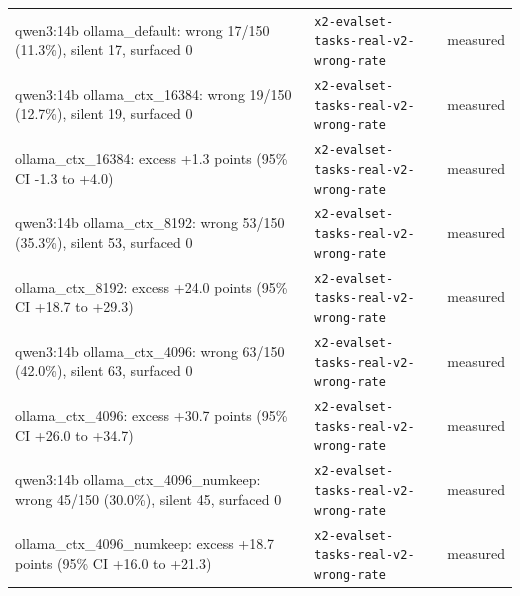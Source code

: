\begin{longtable}{>{\raggedright\arraybackslash}p{}>{\raggedright\arraybackslash}p{}>{\raggedright\arraybackslash}p{}}
\small qwen3:14b ollama\_default: wrong 17/150 (11.3\%), silent 17, surfaced 0 & {\footnotesize \texttt{x2-\allowbreak{}evalset-\allowbreak{}tasks-\allowbreak{}real-\allowbreak{}v2-\allowbreak{}wrong-\allowbreak{}rate}} & \small measured \\

\small qwen3:14b ollama\_ctx\_16384: wrong 19/150 (12.7\%), silent 19, surfaced 0 & {\footnotesize \texttt{x2-\allowbreak{}evalset-\allowbreak{}tasks-\allowbreak{}real-\allowbreak{}v2-\allowbreak{}wrong-\allowbreak{}rate}} & \small measured \\

\small ollama\_ctx\_16384: excess +1.3 points (95\% CI -1.3 to +4.0) & {\footnotesize \texttt{x2-\allowbreak{}evalset-\allowbreak{}tasks-\allowbreak{}real-\allowbreak{}v2-\allowbreak{}wrong-\allowbreak{}rate}} & \small measured \\

\small qwen3:14b ollama\_ctx\_8192: wrong 53/150 (35.3\%), silent 53, surfaced 0 & {\footnotesize \texttt{x2-\allowbreak{}evalset-\allowbreak{}tasks-\allowbreak{}real-\allowbreak{}v2-\allowbreak{}wrong-\allowbreak{}rate}} & \small measured \\

\small ollama\_ctx\_8192: excess +24.0 points (95\% CI +18.7 to +29.3) & {\footnotesize \texttt{x2-\allowbreak{}evalset-\allowbreak{}tasks-\allowbreak{}real-\allowbreak{}v2-\allowbreak{}wrong-\allowbreak{}rate}} & \small measured \\

\small qwen3:14b ollama\_ctx\_4096: wrong 63/150 (42.0\%), silent 63, surfaced 0 & {\footnotesize \texttt{x2-\allowbreak{}evalset-\allowbreak{}tasks-\allowbreak{}real-\allowbreak{}v2-\allowbreak{}wrong-\allowbreak{}rate}} & \small measured \\

\small ollama\_ctx\_4096: excess +30.7 points (95\% CI +26.0 to +34.7) & {\footnotesize \texttt{x2-\allowbreak{}evalset-\allowbreak{}tasks-\allowbreak{}real-\allowbreak{}v2-\allowbreak{}wrong-\allowbreak{}rate}} & \small measured \\

\small qwen3:14b ollama\_ctx\_4096\_numkeep: wrong 45/150 (30.0\%), silent 45, surfaced 0 & {\footnotesize \texttt{x2-\allowbreak{}evalset-\allowbreak{}tasks-\allowbreak{}real-\allowbreak{}v2-\allowbreak{}wrong-\allowbreak{}rate}} & \small measured \\

\small ollama\_ctx\_4096\_numkeep: excess +18.7 points (95\% CI +16.0 to +21.3) & {\footnotesize \texttt{x2-\allowbreak{}evalset-\allowbreak{}tasks-\allowbreak{}real-\allowbreak{}v2-\allowbreak{}wrong-\allowbreak{}rate}} & \small measured \\


\end{longtable}
